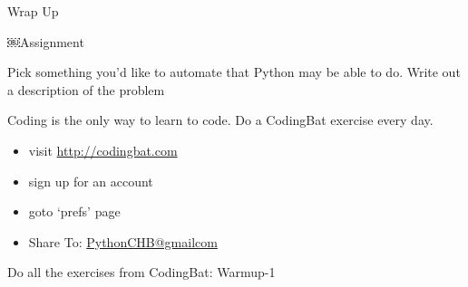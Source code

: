\documentclass{beamer}
\begin{document}
\begin{frame}[fragile]{Wrap Up}

{\Large￼Assignment}

\vspace{0.25in}
Pick something you'd like to automate that Python may be able to do. Write out a description of the problem

\vspace{0.25in}
Coding is the only way to learn to code. Do a CodingBat exercise every day.
\begin{itemize}
  \item visit \url{http://codingbat.com}
  \item sign up for an account
  \item goto ‘prefs’ page
  \item Share To: \url{PythonCHB@gmailcom}
\end{itemize}

Do all the exercises from CodingBat: Warmup-1 

\end{frame}
\end{document}
